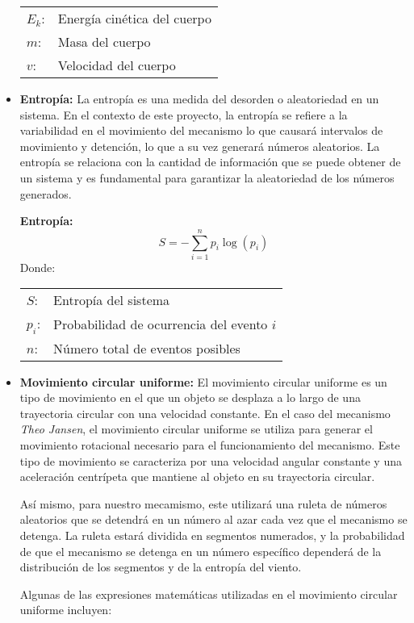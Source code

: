 \begin{itemize}
\begin{tabular}{@{}ll}
  \(E_k\): & Energía cinética del cuerpo \\
  \(m\):   & Masa del cuerpo \\
  \(v\):   & Velocidad del cuerpo \\
\end{tabular}

  \item \textbf{Entropía:} La entropía es una medida del desorden o aleatoriedad en un sistema. En el contexto de este proyecto, la entropía se refiere a la variabilidad en el movimiento del mecanismo lo que causará intervalos de movimiento y detención, lo que a su vez generará números aleatorios. La entropía se relaciona con la cantidad de información que se puede obtener de un sistema y es fundamental para garantizar la aleatoriedad de los números generados.
  
\textbf{Entropía:}
\begin{equation}
S = -\sum_{i=1}^{n} p_i \log(p_i)
\end{equation}
Donde:  

\begin{tabular}{@{}ll}
  \(S\): & Entropía del sistema \\
  \(p_i\): & Probabilidad de ocurrencia del evento \(i\) \\
  \(n\): & Número total de eventos posibles \\
\end{tabular}

  \item \textbf{Movimiento circular uniforme:} El movimiento circular uniforme es un tipo de movimiento en el que un objeto se desplaza a lo largo de una trayectoria circular con una velocidad constante. En el caso del mecanismo \textit{Theo Jansen}, el movimiento circular uniforme se utiliza para generar el movimiento rotacional necesario para el funcionamiento del mecanismo. Este tipo de movimiento se caracteriza por una velocidad angular constante y una aceleración centrípeta que mantiene al objeto en su trayectoria circular.
  
  Así mismo, para nuestro mecamismo, este utilizará una ruleta de números aleatorios que se detendrá en un número al azar cada vez que el mecanismo se detenga. La ruleta estará dividida en segmentos numerados, y la probabilidad de que el mecanismo se detenga en un número específico dependerá de la distribución de los segmentos y de la entropía del viento.

  Algunas de las expresiones matemáticas utilizadas en el movimiento circular uniforme incluyen:


\end{itemize}
